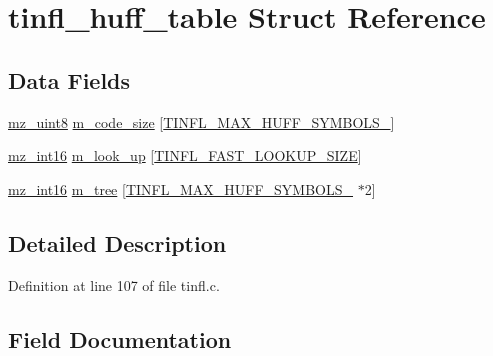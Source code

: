 \hypertarget{structtinfl__huff__table}{}\section{tinfl\+\_\+huff\+\_\+table Struct Reference}
\label{structtinfl__huff__table}
\subsection*{Data Fields}
\begin{DoxyCompactItemize}
\item 
\mbox{\hyperlink{tinfl_8c_a9354eca32f90733aa9bb3738c92da596}{mz\+\_\+uint8}} \mbox{\hyperlink{structtinfl__huff__table_a58f8221c339e4d285e45a552c247a74b}{m\+\_\+code\+\_\+size}} \mbox{[}\mbox{\hyperlink{tinfl_8c_adf764cbdea00d65edcd07bb9953ad2b7abc60f0bf72551ed7cbbf1ed9b20752ba}{T\+I\+N\+F\+L\+\_\+\+M\+A\+X\+\_\+\+H\+U\+F\+F\+\_\+\+S\+Y\+M\+B\+O\+L\+S\+\_}}\mbox{]}
\item 
\mbox{\hyperlink{tinfl_8c_a5a94836eff2f4841bcdd2eb4ea3b8cc4}{mz\+\_\+int16}} \mbox{\hyperlink{structtinfl__huff__table_a6aae70a358ad8ca883a5e79e3331389d}{m\+\_\+look\+\_\+up}} \mbox{[}\mbox{\hyperlink{tinfl_8c_adf764cbdea00d65edcd07bb9953ad2b7a650112828c38f327bd914ec150855c87}{T\+I\+N\+F\+L\+\_\+\+F\+A\+S\+T\+\_\+\+L\+O\+O\+K\+U\+P\+\_\+\+S\+I\+ZE}}\mbox{]}
\item 
\mbox{\hyperlink{tinfl_8c_a5a94836eff2f4841bcdd2eb4ea3b8cc4}{mz\+\_\+int16}} \mbox{\hyperlink{structtinfl__huff__table_a3efb91b83b75d4b4792bee6111d80cb9}{m\+\_\+tree}} \mbox{[}\mbox{\hyperlink{tinfl_8c_adf764cbdea00d65edcd07bb9953ad2b7abc60f0bf72551ed7cbbf1ed9b20752ba}{T\+I\+N\+F\+L\+\_\+\+M\+A\+X\+\_\+\+H\+U\+F\+F\+\_\+\+S\+Y\+M\+B\+O\+L\+S\+\_}} $\ast$2\mbox{]}
\end{DoxyCompactItemize}


\subsection{Detailed Description}


Definition at line 107 of file tinfl.\+c.



\subsection{Field Documentation}
\mbox{\label{structtinfl__huff__table_a58f8221c339e4d285e45a552c247a74b}} 
